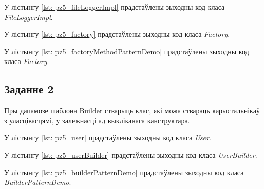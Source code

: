 

У лістынгу \ref{lst: pz5_fileLoggerImpl} прадстаўлены зыходны код класа \textit{FileLoggerImpl}.




У лістынгу \ref{lst: pz5_factory} прадстаўлены зыходны код класа \textit{Factory}.



У лістынгу \ref{lst: pz5_factoryMethodPatternDemo} прадстаўлены зыходны код класа \textit{Factory}.



\vspace{-\baselineskip}
\subsection{Заданне 2}

Пры дапамозе шаблона Builder стварыць клас, які можа ствараць
карыстальнікаў з уласцівасцямі, у залежнасці ад выкліканага канструктара.

У лістынгу \ref{lst: pz5_user} прадстаўлены зыходны код класа \textit{User}.



У лістынгу \ref{lst: pz5_userBuilder} прадстаўлены зыходны код класа \textit{UserBuilder}.



У лістынгу \ref{lst: pz5_builderPatternDemo} прадстаўлены зыходны код класа \textit{BuilderPatternDemo}.



